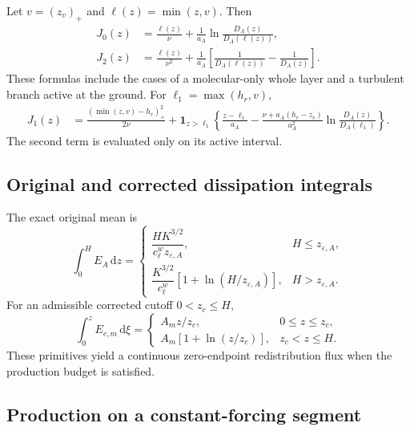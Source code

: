 \documentclass[11pt,a4paper]{article}
\numberwithin{equation}{section}
\newcommand{\eps}{\varepsilon}
\newcommand{\dd}{\mathrm d}
\begin{document}
Let $v=(z_v)_+$ and $\ell(z)=\min(z,v)$.
Then
\begin{align}
 J_0(z)&=\frac{\ell(z)}{\nu}
       +\frac1{a_A}\ln\frac{D_A(z)}{D_A(\ell(z))},
       \label{awf:J0}\\
 J_2(z)&=\frac{\ell(z)}{\nu^2}
       +\frac1{a_A}\left[\frac1{D_A(\ell(z))}-\frac1{D_A(z)}\right].
       \label{awf:J2}
\end{align}
These formulas include the cases of a molecular-only whole layer and
a turbulent branch active at the ground. For $\ell_1=\max(h_r,v)$,
\begin{equation}
 \begin{aligned}
 J_1(z)&=\frac{(\min(z,v)-h_r)_+^2}{2\nu}
       +\mathbf1_{z>\ell_1}\left\{
          \frac{z-\ell_1}{a_A}
          -\frac{\nu+a_A(h_r-z_v)}{a_A^2}
             \ln\frac{D_A(z)}{D_A(\ell_1)}\right\}.
 \end{aligned}
 \label{awf:J1}
\end{equation}
The second term is evaluated only on its active interval.


\subsection{Original and corrected dissipation integrals}

The exact original mean is
\begin{equation}
 \int_0^H E_A\,\dd z=
 \begin{cases}
 \dfrac{HK^{3/2}}{c_\ell^w z_{\eps,A}},&H\le z_{\eps,A},\\[2mm]
 \dfrac{K^{3/2}}{c_\ell^w}
 [1+\ln(H/z_{\eps,A})],&H>z_{\eps,A}.
 \end{cases}
\end{equation}
For an admissible corrected cutoff $0<z_c\le H$,
\begin{equation}
 \int_0^z E_{c,m}\,\dd\xi=
 \begin{cases}
 A_m z/z_c,&0\le z\le z_c,\\
 A_m[1+\ln(z/z_c)],&z_c<z\le H.
 \end{cases}
 \label{app:Ec-primitive}
\end{equation}
These primitives yield a continuous zero-endpoint redistribution flux
when the production budget is satisfied.

\subsection{Production on a constant-forcing segment}
\end{document}
